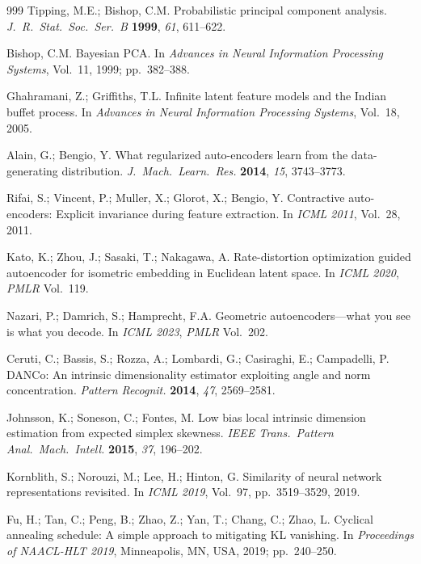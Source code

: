 \documentclass[make,article,submit,pdftex,moreauthors]{Definitions/mdpi}
\begin{document}
\begin{thebibliography}{999}
Tipping, M.E.; Bishop, C.M.
Probabilistic principal component analysis.
\textit{J.\ R.\ Stat.\ Soc.\ Ser.\ B} \textbf{1999}, \textit{61}, 611--622.

Bishop, C.M.
Bayesian PCA.
In \textit{Advances in Neural Information Processing Systems}, Vol.~11,
1999; pp.~382--388.

Ghahramani, Z.; Griffiths, T.L.
Infinite latent feature models and the Indian buffet process.
In \textit{Advances in Neural Information Processing Systems}, Vol.~18,
2005.

Alain, G.; Bengio, Y.
What regularized auto-encoders learn from the data-generating distribution.
\textit{J.\ Mach.\ Learn.\ Res.} \textbf{2014}, \textit{15}, 3743--3773.

Rifai, S.; Vincent, P.; Muller, X.; Glorot, X.; Bengio, Y.
Contractive auto-encoders: Explicit invariance during feature extraction.
In \textit{ICML 2011}, Vol.~28, 2011.

Kato, K.; Zhou, J.; Sasaki, T.; Nakagawa, A.
Rate-distortion optimization guided autoencoder for isometric embedding in
Euclidean latent space.
In \textit{ICML 2020}, \textit{PMLR} Vol.~119.

Nazari, P.; Damrich, S.; Hamprecht, F.A.
Geometric autoencoders---what you see is what you decode.
In \textit{ICML 2023}, \textit{PMLR} Vol.~202.

Ceruti, C.; Bassis, S.; Rozza, A.; Lombardi, G.; Casiraghi, E.;
Campadelli, P.
DANCo: An intrinsic dimensionality estimator exploiting angle and norm
concentration.
\textit{Pattern Recognit.} \textbf{2014}, \textit{47}, 2569--2581.

Johnsson, K.; Soneson, C.; Fontes, M.
Low bias local intrinsic dimension estimation from expected simplex
skewness.
\textit{IEEE Trans.\ Pattern Anal.\ Mach.\ Intell.} \textbf{2015},
\textit{37}, 196--202.

Kornblith, S.; Norouzi, M.; Lee, H.; Hinton, G.
Similarity of neural network representations revisited.
In \textit{ICML 2019}, Vol.~97, pp.~3519--3529, 2019.

Fu, H.; Tan, C.; Peng, B.; Zhao, Z.; Yan, T.; Chang, C.; Zhao, L.
Cyclical annealing schedule: A simple approach to mitigating {KL} vanishing.
In \textit{Proceedings of NAACL-HLT 2019}, Minneapolis, MN, USA, 2019;
pp.~240--250.


\end{thebibliography}
\end{document}
